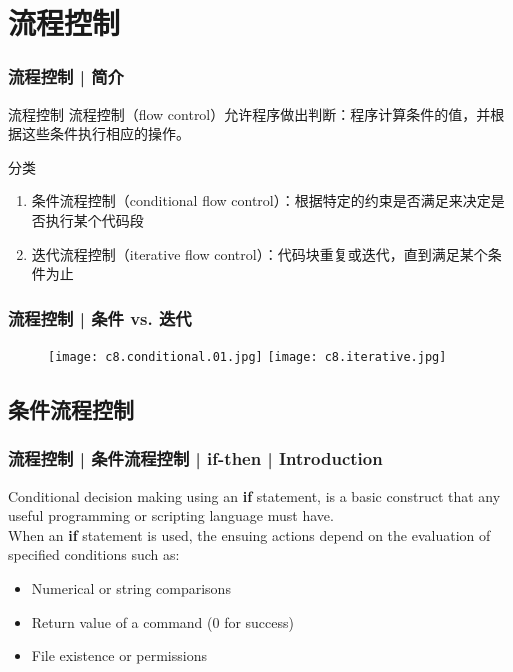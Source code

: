 \section{流程控制}
\begin{frame}
  \frametitle{流程控制 | 简介}
  \begin{block}{流程控制}
    流程控制（flow control）允许程序做出判断：程序计算条件的值，并根据这些条件执行相应的操作。
  \end{block}
  \pause
  \begin{block}{\alert{分类}}
    \begin{enumerate}
      \item 条件流程控制（conditional flow control）：根据特定的约束是否满足来决定是否执行某个代码段
      \item 迭代流程控制（iterative flow control）：代码块重复或迭代，直到满足某个条件为止
    \end{enumerate}
  \end{block}
\end{frame}

\begin{frame}
  \frametitle{流程控制 | 条件 vs. 迭代}
  \begin{figure}
    \centering
    \texttt{[image: c8.conditional.01.jpg]}
    \texttt{[image: c8.iterative.jpg]}
  \end{figure}
\end{frame}

\subsection{条件流程控制}
\begin{frame}
  \frametitle{流程控制 | 条件流程控制 | if-then | Introduction}
  Conditional decision making using an \textbf{if} statement, is a basic
  construct that any useful programming or scripting language must
  have.\\
  \vspace{0.3cm}
  When an \textbf{if} statement is used, the ensuing actions depend on the evaluation of specified conditions such as:
  \begin{itemize}
    \item Numerical or string comparisons
    \item Return value of a command (0 for success)
    \item File existence or permissions
  \end{itemize}
\end{frame}

